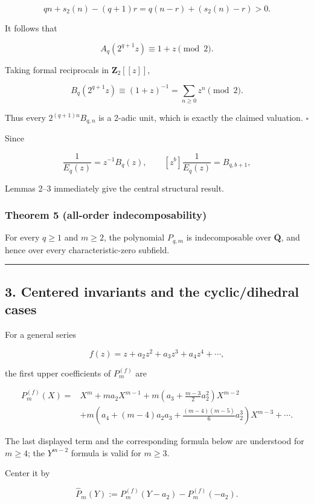 \[
 qn+s_2(n)-(q+1)r
 =q(n-r)+(s_2(n)-r)>0.
\]

It follows that

\[
 A_q(2^{q+1}z)\equiv1+z\pmod2.
\]

Taking formal reciprocals in \(\mathbf Z_2[[z]]\),

\[
 B_q(2^{q+1}z)
 \equiv(1+z)^{-1}
 =\sum_{n\geq0}z^n\pmod2.
\]

Thus every \(2^{(q+1)n}B_{q,n}\) is a 2-adic unit, which is exactly the
claimed valuation. \(\square\)

Since

\[
 \frac1{E_q(z)}=z^{-1}B_q(z),
 \qquad
 [z^b]\frac1{E_q(z)}=B_{q,b+1},
\]

Lemmas 2--3 immediately give the central structural result.

\subsubsection{Theorem 5 (all-order indecomposability)}

For every \(q\geq1\) and \(m\geq2\), the polynomial \(P_{q,m}\) is
indecomposable over \(\overline{\mathbf Q}\), and hence over every
characteristic-zero subfield.

\begin{center}\rule{0.5\linewidth}{0.5pt}\end{center}

\subsection{3. Centered invariants and the cyclic/dihedral cases}

For a general series

\[
 f(z)=z+a_2z^2+a_3z^3+a_4z^4+\cdots,
\]

the first upper coefficients of \(P_m^{(f)}\) are

\[
\begin{aligned}
P_m^{(f)}(X)={}&X^m+ma_2X^{m-1}
 +m\left(a_3+\frac{m-3}{2}a_2^2\right)X^{m-2}\\
&+m\left(a_4+(m-4)a_2a_3
 +\frac{(m-4)(m-5)}6a_2^3\right)X^{m-3}+\cdots .
\end{aligned}
\]

The last displayed term and the corresponding formula below are understood
for \(m\ge4\); the \(Y^{m-2}\) formula is valid for \(m\ge3\).

Center it by

\[
 \widehat P_m(Y):=P_m^{(f)}(Y-a_2)-P_m^{(f)}(-a_2).
\]

